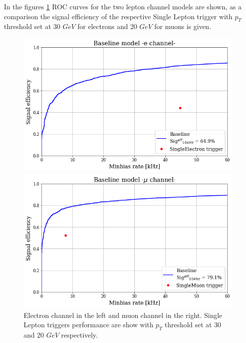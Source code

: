 \documentclass[../../main.tex]{subfiles}
\begin{document}
In the figures \ref{fig:baseline_models} ROC curves for the two lepton channel models are shown, as a comparison the signal efficiency of the respective Single Lepton trigger with $p_T$ threshold set at 30 $GeV$ for electrons and 20 $GeV$ for muons\cite{L1T-2up} is given.  

\begin{figure}[ht] 
  \label{ fig7} 
  \begin{minipage}[b]{0.5\linewidth}
    \centering
    \includegraphics[width=.95\linewidth]{sections/05/Images/baseline_1ele_ROC.png} 
    \vspace{4ex}
  \end{minipage}%
  \begin{minipage}[b]{0.5\linewidth}
    \centering
    \includegraphics[width=.95\linewidth]{sections/05/Images/baseline_1mu_ROC.png} 
    \vspace{4ex}
  \end{minipage} 
  \caption{Electron channel in the left and muon channel in the right. Single Lepton triggers performance are show with $p_T$ threshold set at 30 and 20 $GeV$ respectively.}
  \label{fig:baseline_models}
\end{figure}
\end{document}
